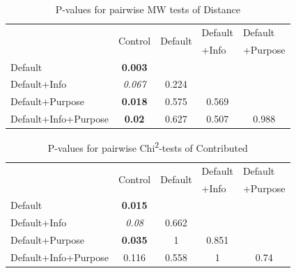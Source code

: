 \documentclass[review, authoryear,12pt]{elsarticle}
\begin{document}
\begin{table}[htbp]
  \centering
  \begin{adjustbox}{max width=\textwidth}
  \caption{P-values for pairwise MW tests of Distance}
    \begin{tabular}{lcccc}
    \toprule
    \toprule
    \multirow{2}[2]{*}{} & \multicolumn{1}{r}{\multirow{2}[2]{*}{Control}} & \multicolumn{1}{r}{\multirow{2}[2]{*}{Default}} & \multicolumn{1}{l}{Default} & \multicolumn{1}{l}{Default} \\
          &       &       & \multicolumn{1}{l}{+Info} & \multicolumn{1}{l}{+Purpose} \\
    \midrule
    Default & \textbf{0.003} &       &       &  \\
    Default+Info & \textit{0.067} & 0.224 &       &  \\
    Default+Purpose & \textbf{0.018} & 0.575 & 0.569 &  \\
    Default+Info+Purpose & \textbf{0.02} & 0.627 & 0.507 & 0.988 \\
    \bottomrule
    \bottomrule
    \end{tabular}%
    \end{adjustbox}
  \label{tabb8}%
\end{table}%




\begin{table}[htbp]
  \centering
  \begin{adjustbox}{max width=\textwidth}
  \caption{P-values for pairwise Chi\textsuperscript{2}-tests of Contributed }
    \begin{tabular}{lcccc}
    \toprule
    \toprule
    \multirow{2}[2]{*}{} & \multicolumn{1}{r}{\multirow{2}[2]{*}{Control}} & \multicolumn{1}{r}{\multirow{2}[2]{*}{Default}} & \multicolumn{1}{l}{Default} & \multicolumn{1}{l}{Default} \\
          &       &       & \multicolumn{1}{l}{+Info} & \multicolumn{1}{l}{+Purpose} \\
    \midrule
    Default & \textbf{0.015} &       &       &  \\
    Default+Info & \textit{0.08} & 0.662 &       &  \\
    Default+Purpose & \textbf{0.035} & 1     & 0.851 &  \\
    Default+Info+Purpose & 0.116 & 0.558 & 1     & 0.74 \\
    \bottomrule
    \bottomrule
    \end{tabular}%
  \label{tabb9}%
  \end{adjustbox}
\end{table}%
\end{document}
